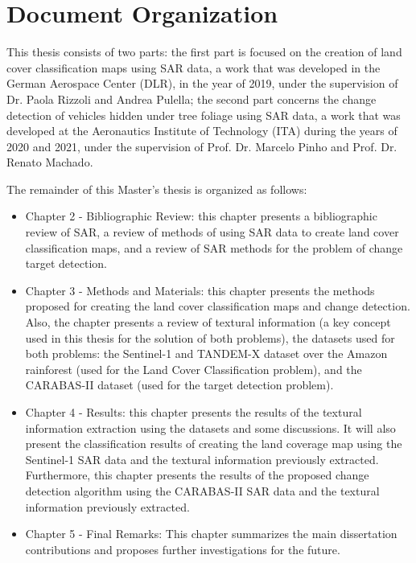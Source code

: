 \section{Document Organization}
This thesis consists of two parts: the first part is focused on the creation of land cover classification maps
using SAR data, a work that was developed in the German Aerospace Center (DLR), in the year of 2019, under the supervision of Dr. Paola Rizzoli and Andrea Pulella; the second part concerns the
change detection of vehicles hidden under tree foliage using SAR data, a work that was developed at the Aeronautics Institute of Technology (ITA) during the years of 2020 and 2021, under the supervision of Prof. Dr. Marcelo Pinho and Prof. Dr. Renato Machado.

The remainder of this Master's thesis is organized as follows:

\begin{itemize}
    \item Chapter 2 - Bibliographic Review: this chapter presents a bibliographic review of SAR, a review of methods of using SAR data to create land cover classification maps, and a review of SAR methods for the problem of change target detection.
    \item Chapter 3 - Methods and Materials: this chapter presents the methods proposed for creating the land cover classification maps and change detection. Also, the chapter presents a review of textural information (a key concept used in this thesis for the solution of both problems), the datasets used for both problems: the Sentinel-1 and TANDEM-X dataset over the Amazon rainforest (used for the Land Cover Classification problem), and the CARABAS-II dataset (used for the target detection problem).
    \item Chapter 4 - Results: this chapter presents the results of the textural information extraction using the datasets and some discussions. It will also present the classification results of creating the land coverage map using the Sentinel-1 SAR data and the textural information previously extracted. Furthermore, this chapter presents the results of the proposed change detection algorithm using the CARABAS-II SAR data and the textural information previously extracted.
    \item Chapter 5 - Final Remarks: This chapter summarizes the main dissertation contributions and proposes further investigations for the future.
\end{itemize}


